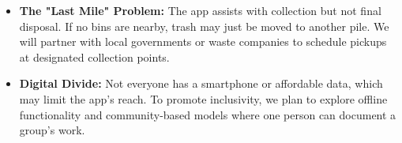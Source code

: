 {\begin{description}
		      \begin{itemize}
			      \item \textbf{The "Last Mile" Problem:} The app assists with collection but not final disposal. If no bins are nearby, trash may just be moved to another pile. We will partner with local governments or waste companies to schedule pickups at designated collection points.

			      \item \textbf{Digital Divide:} Not everyone has a smartphone or affordable data, which may limit the app's reach. To promote inclusivity, we plan to explore offline functionality and community-based models where one person can document a group's work.
		      \end{itemize}
	\end{description}
}
